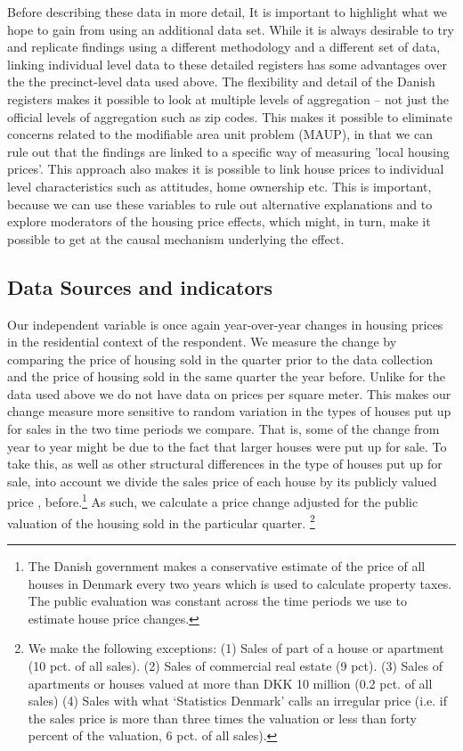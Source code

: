 \documentclass[12pt,a4paper]{article}
\begin{document}
Before describing these data in more detail, It is important to highlight what we hope to gain from using an additional data set. While it is always desirable to try and replicate findings using a different methodology and a different set of data, linking individual level data to these detailed registers has some advantages over the the precinct-level data used above. The flexibility and detail of the Danish registers makes it possible to look at multiple levels of aggregation -- not just the official levels of aggregation such as zip codes. This makes it possible to eliminate concerns related to the modifiable area unit problem (MAUP), in that we can rule out that the findings are linked to a specific way of measuring 'local housing prices'.  This approach also makes  it is possible to link house prices to individual level characteristics such as attitudes, home ownership etc. This is important, because we can use these variables to rule out alternative explanations and to explore moderators of the housing price effects, which might, in turn, make it possible to get at the causal mechanism underlying the effect.


\subsection{Data Sources and indicators}

Our independent variable is once again year-over-year changes in housing prices in the residential context of the respondent. We measure the change by comparing the price of housing sold in the quarter prior to the data collection and the price of housing sold in the same quarter the year before. Unlike for the data used above we do not have data on prices per square meter. This makes our change measure more sensitive to random variation in the types of houses put up for sales in the two time periods we compare. That is, some of the change from year to year might be due to the fact that larger houses were put up for sale. To take this, as well as other structural differences in the type of houses put up for sale, into account we divide the sales price of each house by its publicly valued price , before.\footnote{The Danish government makes a conservative estimate of the price of all houses in Denmark every two years which is used to calculate property taxes. The public evaluation was constant across the time periods we use to estimate house price changes.} As such, we calculate a price change adjusted for the public valuation of the housing sold in the particular quarter. \footnote{We make the following exceptions: (1) Sales of part of a house or apartment (10 pct. of all sales). (2) Sales of commercial real estate (9 pct). (3) Sales of apartments or houses valued at more than DKK 10 million (0.2 pct. of all sales)  (4) Sales with what `Statistics Denmark' calls an irregular price (i.e. if the sales price is more than three times the valuation or less than forty percent of the valuation, 6 pct. of all sales).} 
\end{document}
